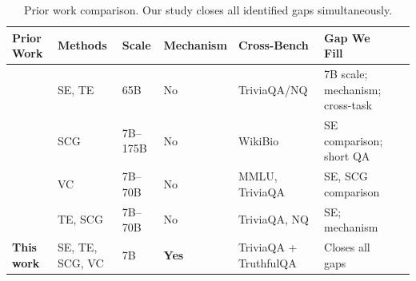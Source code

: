 \begin{table}[t]
\caption{Prior work comparison. Our study closes all identified gaps simultaneously.}
\label{tab:prior_work}
\centering
\small
\begin{tabular}{lllllll}
\toprule
Prior Work & Methods & Scale & Mechanism & Cross-Bench & Gap We Fill \\
\midrule
\citet{Kuhn2023} & SE, TE & 65B & No & TriviaQA/NQ & 7B scale; mechanism; cross-task \\
\citet{Manakul2023} & SCG & 7B--175B & No & WikiBio & SE comparison; short QA \\
\citet{Xiong2023} & VC & 7B--70B & No & MMLU, TriviaQA & SE, SCG comparison \\
\citet{Huang2023} & TE, SCG & 7B--70B & No & TriviaQA, NQ & SE; mechanism \\
\textbf{This work} & SE, TE, SCG, VC & 7B & \textbf{Yes} & TriviaQA + TruthfulQA & Closes all gaps \\
\bottomrule
\end{tabular}
\end{table}
